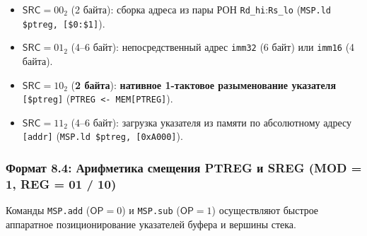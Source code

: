 \documentclass[11pt,a4paper]{article}
\newcommand{\reg}[1]{\texttt{#1}}
\newcommand{\field}[1]{\textsf{#1}}
\begin{document}
\begin{itemize}
  \item $\field{SRC} = 00_2$ (2 байта): сборка адреса из пары РОН \reg{Rd\_hi}:\reg{Rs\_lo} (\texttt{MSP.ld \$ptreg, [\$0:\$1]}).
  \item $\field{SRC} = 01_2$ (4--6 байт): непосредственный адрес \texttt{imm32} (6 байт) или \texttt{imm16} (4 байта).
  \item $\field{SRC} = 10_2$ (\textbf{2 байта}): \textbf{нативное 1-тактовое разыменование указателя} \texttt{[\$ptreg]} (\texttt{PTREG <- MEM[PTREG]}).
  \item $\field{SRC} = 11_2$ (4--6 байт): загрузка указателя из памяти по абсолютному адресу \texttt{[addr]} (\texttt{MSP.ld \$ptreg, [0xA000]}).
\end{itemize}

\subsubsection{Формат 8.4: Арифметика смещения PTREG и SREG (MOD = 1, REG = 01 / 10)}
Команды \texttt{MSP.add} ($\field{OP}=0$) и \texttt{MSP.sub} ($\field{OP}=1$) осуществляют быстрое аппаратное позиционирование указателей буфера и вершины стека.
\end{document}
